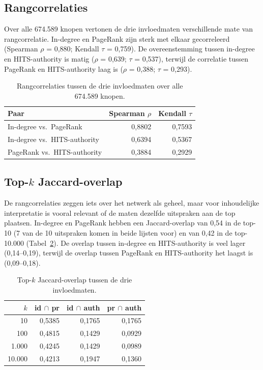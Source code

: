 \documentclass[a4paper, 12pt]{report}
\begin{document}
\subsection{Rangcorrelaties} Over alle 674.589 knopen vertonen de drie invloedmaten verschillende mate van rangcorrelatie. In-degree en PageRank zijn sterk met elkaar gecorreleerd (Spearman $\rho$ = 0,880; Kendall $\tau$ = 0,759). De overeenstemming tussen in-degree en HITS-authority is matig ($\rho$ = 0,639; $\tau$ = 0,537), terwijl de correlatie tussen PageRank en HITS-authority laag is ($\rho$ = 0,388; $\tau$ = 0,293).


\begin{table}[H]
  \centering
  \caption{Rangcorrelaties tussen de drie invloedmaten over alle 674.589 knopen.}
  \label{tab:dv3-rangcorrelatie}
  \begin{tabular}{lrr}
    \toprule
    Paar & Spearman $\rho$ & Kendall $\tau$ \\
    \midrule
    In-degree vs.\ PageRank        & 0,8802 & 0,7593 \\
    In-degree vs.\ HITS-authority  & 0,6394 & 0,5367 \\
    PageRank vs.\ HITS-authority   & 0,3884 & 0,2929 \\
    \bottomrule
  \end{tabular}
\end{table}


\subsection{Top-$k$ Jaccard-overlap} 
De rangcorrelaties zeggen iets over het netwerk als geheel, maar voor inhoudelijke interpretatie is vooral relevant of de maten dezelfde uitspraken aan de top plaatsen. In-degree en PageRank hebben een Jaccard-overlap van 0,54 in de top-10 (7 van de 10 uitspraken komen in beide lijsten voor) en van 0,42 in de top-10.000 (Tabel~\ref{tab:dv3-jaccard}). De overlap tussen in-degree en HITS-authority is veel lager (0,14--0,19), terwijl de overlap tussen PageRank en HITS-authority het laagst is (0,09--0,18). 


\begin{table}[ht]
  \centering
  \caption{Top-$k$ Jaccard-overlap tussen de drie invloedmaten.}
  \label{tab:dv3-jaccard}
  \begin{tabular}{rrrr}
    \toprule
    $k$ & id $\cap$ pr & id $\cap$ auth & pr $\cap$ auth \\
    \midrule
    10      & 0,5385 & 0,1765 & 0,1765 \\
    100     & 0,4815 & 0,1429 & 0,0929 \\
    1.000   & 0,4245 & 0,1429 & 0,0989 \\
    10.000  & 0,4213 & 0,1947 & 0,1360 \\
    \bottomrule
  \end{tabular}
\end{table}
\end{document}
